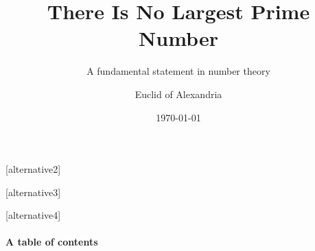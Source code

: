 \documentclass[aspectratio=169, table]{beamer}
\title{There Is No Largest Prime Number}
\subtitle{A fundamental statement in number theory}
\date{\today}
\author[Euclid]{Euclid of Alexandria}
\begin{document}
\begin{frame}
\titlepage
\end{frame}

[alternative2]


\begin{frame}
	\titlepage
\end{frame}

[alternative3]

\titlegraphic{}

\begin{frame}
	\titlepage
\end{frame}

[alternative4]


\begin{frame}
	\titlepage
\end{frame}

\begin{frame}
	\framesubtitle{A table of contents}
	\tocpage
\end{frame}
\end{document}
